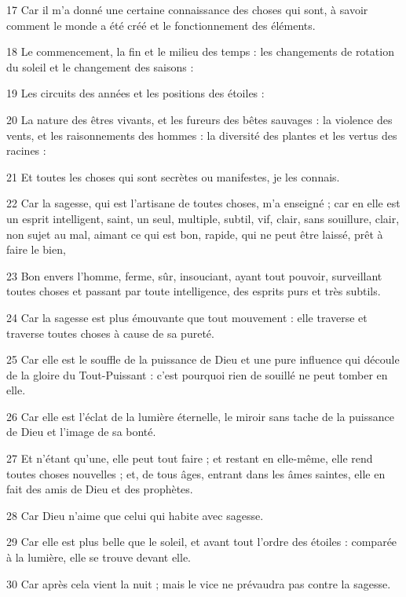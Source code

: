 \par 17 Car il m'a donné une certaine connaissance des choses qui sont, à savoir comment le monde a été créé et le fonctionnement des éléments.
\par 18 Le commencement, la fin et le milieu des temps : les changements de rotation du soleil et le changement des saisons :
\par 19 Les circuits des années et les positions des étoiles :
\par 20 La nature des êtres vivants, et les fureurs des bêtes sauvages : la violence des vents, et les raisonnements des hommes : la diversité des plantes et les vertus des racines :
\par 21 Et toutes les choses qui sont secrètes ou manifestes, je les connais.
\par 22 Car la sagesse, qui est l'artisane de toutes choses, m'a enseigné ; car en elle est un esprit intelligent, saint, un seul, multiple, subtil, vif, clair, sans souillure, clair, non sujet au mal, aimant ce qui est bon, rapide, qui ne peut être laissé, prêt à faire le bien,
\par 23 Bon envers l'homme, ferme, sûr, insouciant, ayant tout pouvoir, surveillant toutes choses et passant par toute intelligence, des esprits purs et très subtils.
\par 24 Car la sagesse est plus émouvante que tout mouvement : elle traverse et traverse toutes choses à cause de sa pureté.
\par 25 Car elle est le souffle de la puissance de Dieu et une pure influence qui découle de la gloire du Tout-Puissant : c'est pourquoi rien de souillé ne peut tomber en elle.
\par 26 Car elle est l'éclat de la lumière éternelle, le miroir sans tache de la puissance de Dieu et l'image de sa bonté.
\par 27 Et n'étant qu'une, elle peut tout faire ; et restant en elle-même, elle rend toutes choses nouvelles ; et, de tous âges, entrant dans les âmes saintes, elle en fait des amis de Dieu et des prophètes.
\par 28 Car Dieu n'aime que celui qui habite avec sagesse.
\par 29 Car elle est plus belle que le soleil, et avant tout l'ordre des étoiles : comparée à la lumière, elle se trouve devant elle.
\par 30 Car après cela vient la nuit ; mais le vice ne prévaudra pas contre la sagesse.


